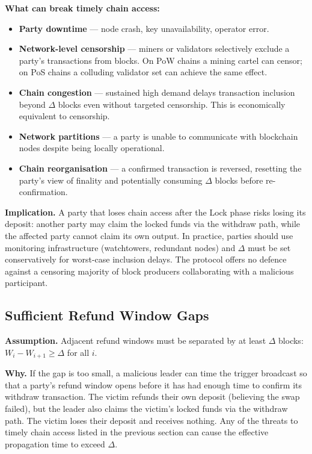 \documentclass[11pt,a4paper]{article}
\begin{document}
\textbf{What can break timely chain access:}
\begin{itemize}
  \item \textbf{Party downtime} --- node crash, key unavailability,
    operator error.

  \item \textbf{Network-level censorship} --- miners or validators
    selectively exclude a party's transactions from blocks.
    On PoW chains a mining cartel can censor; on PoS chains a colluding
    validator set can achieve the same effect.

  \item \textbf{Chain congestion} --- sustained high demand delays
    transaction inclusion beyond $\Delta$ blocks even without targeted
    censorship.
    This is economically equivalent to censorship.

  \item \textbf{Network partitions} --- a party is unable to communicate
    with blockchain nodes despite being locally operational.

  \item \textbf{Chain reorganisation} --- a confirmed transaction is
    reversed, resetting the party's view of finality and potentially
    consuming $\Delta$ blocks before re-confirmation.
\end{itemize}

\textbf{Implication.}\;
A party that loses chain access after the Lock phase risks losing its
deposit: another party may claim the locked funds via the withdraw path,
while the affected party cannot claim its own output.
In practice, parties should use monitoring infrastructure (watchtowers,
redundant nodes) and $\Delta$ must be set conservatively for worst-case
inclusion delays.
The protocol offers no defence against a censoring majority of block
producers collaborating with a malicious participant.

\subsection{Sufficient Refund Window Gaps}

\textbf{Assumption.}\;
Adjacent refund windows must be separated by at least $\Delta$ blocks:
$W_i - W_{i+1} \geq \Delta$ for all $i$.

\textbf{Why.}\;
If the gap is too small, a malicious leader can time the trigger broadcast
so that a party's refund window opens before it has had enough time to
confirm its withdraw transaction.
The victim refunds their own deposit (believing the swap failed), but the
leader also claims the victim's locked funds via the withdraw path.
The victim loses their deposit and receives nothing.
Any of the threats to timely chain access listed in the previous section
can cause the effective propagation time to exceed $\Delta$.
\end{document}
